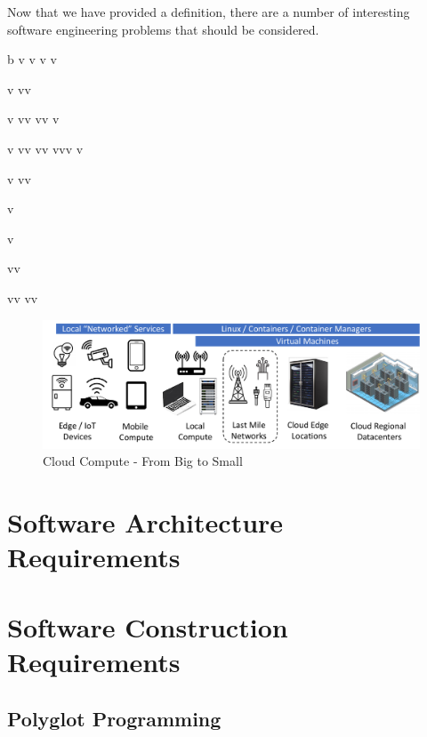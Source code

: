 \documentclass[conference]{IEEEconf}
\begin{document}
Now that we have provided a definition, there are a number of interesting software engineering problems that should be considered. 


b
v
v
v
v

v
vv

v
vv
vv
v

v
vv
vv
vvv
v

v
vv


v


v

vv

vv
vv



\begin{figure}[t!]
	\includegraphics[width=\textwidth]{images/CloudTopo2.pdf}	
	\caption{Cloud Compute - From Big to Small}
\end{figure}

\section{Software Architecture Requirements}
\label{sec:SoftwareArchitecture}

\section{Software Construction Requirements}
\label{sec:SoftwareConstruction}

\subsection{Polyglot Programming}
\label{subsec:Polyglot}




\end{document}
